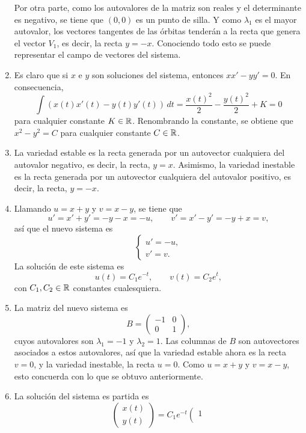 \documentclass[11pt]{report}
\begin{document}
\begin{solution}
\begin{enumerate}
        Por otra parte, como los autovalores de la matriz son reales y el determinante es negativo, se tiene que $(0,0)$ es un punto de silla. Y como $\lambda_1$ es el mayor autovalor, los vectores tangentes de las órbitas tenderán a la recta que genera el vector $V_1$, es decir, la recta $y=-x$. Conociendo todo esto se puede representar el campo de vectores del sistema.
        \item Es claro que si $x$ e $y$ son soluciones del sistema, entonces $xx'-yy'=0$. En consecuencia,
        \[\int(x(t)x'(t)-y(t)y'(t)) \, dt = \frac{x(t)^2}{2}-\frac{y(t)^2}{2} + K = 0\]
        para cualquier constante $K \in \mathbb R$. Renombrando la constante, se obtiene que $x^2-y^2 = C$ para cualquier constante $C\in\mathbb R$.
        \item La variedad estable es la recta generada por un autovector cualquiera del autovalor negativo, es decir, la recta, $y = x$. Asimismo, la variedad inestable es la recta generada por un autovector cualquiera del autovalor positivo, es decir, la recta, $y = -x$.
        \item Llamando $u = x+y$ y $v = x-y$, se tiene que \[u' = x'+y' = -y-x = -u, \qquad v' = x'-y' = -y+x = v,\] así que el nuevo sistema es
        \[\begin{cases}
        u' = -u, \\
        v' = v.
        \end{cases}\]
        La solución de este sistema es
        \[u(t) = C_1e^{-t}, \qquad v(t) = C_2e^t,\]
        con $C_1,C_2\in\mathbb R$ constantes cualesquiera.
        \item La matriz del nuevo sistema es
        \[B = \left(\begin{array}{cc}
            -1 & 0 \\
            0 & 1
        \end{array}\right),\]
        cuyos autovalores son $\lambda_1 = -1$ y $\lambda_2 = 1$. Las columnas de $B$ son autovectores asociados a estos autovalores, así que la variedad estable ahora es la recta $v = 0$, y la variedad inestable, la recta $u = 0$. Como $u = x+y$ y $v = x-y$, esto concuerda con lo que se obtuvo anteriormente.
        \item La solución del sistema es partida es
        \[\left(\begin{array}{c}
            x(t) \\
            y(t)
        \end{array}\right) = C_1e^{-t}\left(\begin{array}{c}
            1 \\

\end{array}\]
\end{enumerate}
\end{solution}
\end{document}
